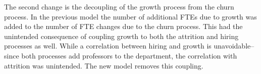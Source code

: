 \documentclass[12pt, a4paper, oneside, headinclude, footinclude,english]{article}
\begin{document}
The second change is the decoupling of the growth process from the churn
process. In the previous model the number of additional FTEs due to growth was
added to the number of FTE changes due to the churn process. This had the
unintended consequence of coupling growth to both the attrition and hiring
processes as well. While a correlation between hiring and growth is
unavoidable--since both processes add professors to the department, the
correlation with attrition was unintended. The new model removes this coupling. 




\renewcommand{\refname}{\spacedlowsmallcaps{References}} 





\end{document}
